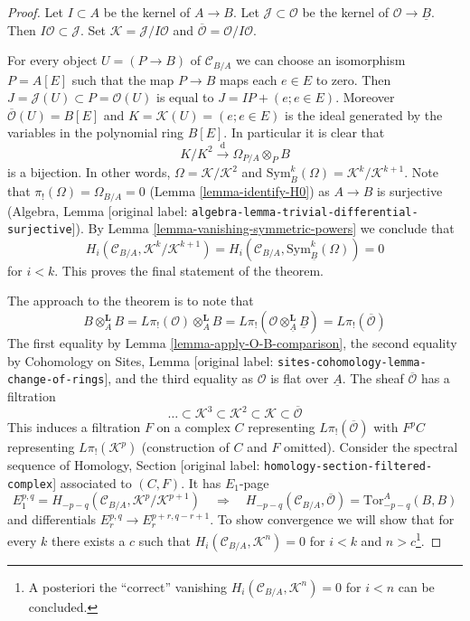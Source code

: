 \documentclass[10pt,a4paper]{article}
\theoremstyle{plain}
\theoremstyle{definition}
\theoremstyle{remark}
\numberwithin{equation}{subsection}
\begin{document}
\begin{proof}
Let $I \subset A$ be the kernel of $A \to B$. Let
$\mathcal{J} \subset \mathcal{O}$
be the kernel of $\mathcal{O} \to \underline{B}$. Then
$I\mathcal{O} \subset \mathcal{J}$. Set
$\mathcal{K} = \mathcal{J}/I\mathcal{O}$ and
$\overline{\mathcal{O}} = \mathcal{O}/I\mathcal{O}$.

\medskip\noindent
For every object $U = (P \to B)$ of $\mathcal{C}_{B/A}$
we can choose an isomorphism $P = A[E]$ such that the map
$P \to B$ maps each $e \in E$ to zero. Then
$J = \mathcal{J}(U) \subset P = \mathcal{O}(U)$
is equal to $J = IP + (e; e \in E)$. Moreover
$\overline{\mathcal{O}}(U) = B[E]$ and $K = \mathcal{K}(U) = (e; e \in E)$
is the ideal generated by the variables in the polynomial ring $B[E]$.
In particular it is clear that
$$
K/K^2 \xrightarrow{\text{d}} \Omega_{P/A} \otimes_P B
$$
is a bijection. In other words, $\Omega = \mathcal{K}/\mathcal{K}^2$
and $\text{Sym}_B^k(\Omega) = \mathcal{K}^k/\mathcal{K}^{k + 1}$.
Note that $\pi_!(\Omega) = \Omega_{B/A} = 0$ (Lemma \ref{lemma-identify-H0})
as $A \to B$ is surjective
(Algebra, Lemma \textnormal{[original label: \nolinkurl{algebra-lemma-trivial-differential-surjective}]}).
By Lemma \ref{lemma-vanishing-symmetric-powers} we conclude that
$$
H_i(\mathcal{C}_{B/A}, \mathcal{K}^k/\mathcal{K}^{k + 1}) =
H_i(\mathcal{C}_{B/A}, \text{Sym}^k_{\underline{B}}(\Omega)) = 0
$$
for $i < k$. This proves the final statement of the theorem.

\medskip\noindent
The approach to the theorem is to note that
$$
B \otimes_A^\mathbf{L} B = L\pi_!(\mathcal{O}) \otimes_A^\mathbf{L} B =
L\pi_!(\mathcal{O} \otimes_{\underline{A}}^\mathbf{L} \underline{B}) =
L\pi_!(\overline{\mathcal{O}})
$$
The first equality by Lemma \ref{lemma-apply-O-B-comparison},
the second equality by
Cohomology on Sites, Lemma \textnormal{[original label: \nolinkurl{sites-cohomology-lemma-change-of-rings}]}, and
the third equality as $\mathcal{O}$ is flat over $\underline{A}$.
The sheaf $\overline{\mathcal{O}}$ has a filtration
$$
\ldots \subset
\mathcal{K}^3 \subset
\mathcal{K}^2 \subset
\mathcal{K} \subset
\overline{\mathcal{O}}
$$
This induces a filtration $F$ on a complex $C$ representing
$L\pi_!(\overline{\mathcal{O}})$ with $F^pC$ representing
$L\pi_!(\mathcal{K}^p)$ (construction of $C$ and $F$ omitted).
Consider the spectral sequence of
Homology, Section \textnormal{[original label: \nolinkurl{homology-section-filtered-complex}]}
associated to $(C, F)$. It has $E_1$-page
$$
E_1^{p, q} = H_{- p - q}(\mathcal{C}_{B/A}, \mathcal{K}^p/\mathcal{K}^{p + 1})
\quad\Rightarrow\quad
H_{- p - q}(\mathcal{C}_{B/A}, \overline{\mathcal{O}}) = 
\text{Tor}_{- p - q}^A(B, B)
$$
and differentials $E_r^{p, q} \to E_r^{p + r, q - r + 1}$. To show convergence
we will show that for every $k$ there exists a $c$ such that
$H_i(\mathcal{C}_{B/A}, \mathcal{K}^n) = 0$
for $i < k$ and $n > c$\footnote{A posteriori
the ``correct'' vanishing $H_i(\mathcal{C}_{B/A}, \mathcal{K}^n) = 0$ for
$i < n$ can be concluded.}.


\end{proof}
\end{document}
